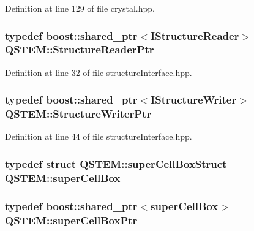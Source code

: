Definition at line 129 of file crystal.\-hpp.

\hypertarget{namespace_q_s_t_e_m_a3496fb9b2de0f3b3350f9b0d5206bc75}{
\subsubsection[{Structure\-Reader\-Ptr}]{\setlength{\rightskip}{0pt plus 5cm}typedef boost\-::shared\-\_\-ptr$<${\bf I\-Structure\-Reader}$>$ {\bf Q\-S\-T\-E\-M\-::\-Structure\-Reader\-Ptr}}}\label{namespace_q_s_t_e_m_a3496fb9b2de0f3b3350f9b0d5206bc75}


Definition at line 32 of file structure\-Interface.\-hpp.

\hypertarget{namespace_q_s_t_e_m_abd9ebd39703fa5559b437aa35900ef5c}{
\subsubsection[{Structure\-Writer\-Ptr}]{\setlength{\rightskip}{0pt plus 5cm}typedef boost\-::shared\-\_\-ptr$<${\bf I\-Structure\-Writer}$>$ {\bf Q\-S\-T\-E\-M\-::\-Structure\-Writer\-Ptr}}}\label{namespace_q_s_t_e_m_abd9ebd39703fa5559b437aa35900ef5c}


Definition at line 44 of file structure\-Interface.\-hpp.

\hypertarget{namespace_q_s_t_e_m_a95dba085aec372efb54903125453c0c1}{
\subsubsection[{super\-Cell\-Box}]{\setlength{\rightskip}{0pt plus 5cm}typedef struct {\bf Q\-S\-T\-E\-M\-::super\-Cell\-Box\-Struct}  {\bf Q\-S\-T\-E\-M\-::super\-Cell\-Box}}}\label{namespace_q_s_t_e_m_a95dba085aec372efb54903125453c0c1}
\hypertarget{namespace_q_s_t_e_m_a4c41158ec44b9a0121ef647bfa3bf4b0}{
\subsubsection[{super\-Cell\-Box\-Ptr}]{\setlength{\rightskip}{0pt plus 5cm}typedef boost\-::shared\-\_\-ptr$<${\bf super\-Cell\-Box}$>$ {\bf Q\-S\-T\-E\-M\-::super\-Cell\-Box\-Ptr}}}\label{namespace_q_s_t_e_m_a4c41158ec44b9a0121ef647bfa3bf4b0}


